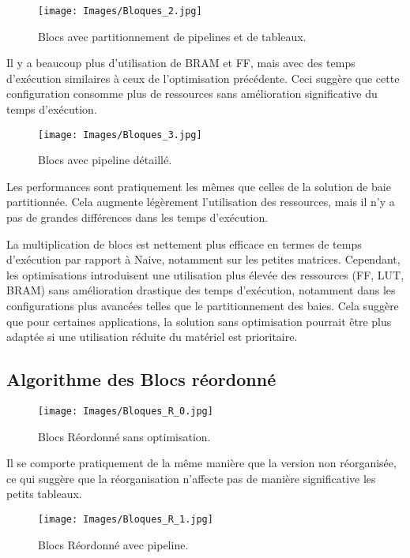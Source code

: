 \documentclass[../CSC_5RO06_TA.tex]{subfiles}
\begin{document}
\begin{figure}[H]
    \centering
    \texttt{[image: Images/Bloques\_2.jpg]}
    \caption{Blocs avec partitionnement de pipelines et de tableaux.}
    \label{fig:11}
\end{figure}

Il y a beaucoup plus d'utilisation de BRAM et FF, mais avec des temps d'exécution similaires à ceux de l'optimisation précédente. Ceci suggère que cette configuration consomme plus de ressources sans amélioration significative du temps d'exécution.

\begin{figure}[H]
    \centering
    \texttt{[image: Images/Bloques\_3.jpg]}
    \caption{Blocs avec pipeline détaillé.}
    \label{fig:12}
\end{figure}


Les performances sont pratiquement les mêmes que celles de la solution de baie partitionnée. Cela augmente légèrement l'utilisation des ressources, mais il n'y a pas de grandes différences dans les temps d'exécution.

La multiplication de blocs est nettement plus efficace en termes de temps d'exécution par rapport à Naive, notamment sur les petites matrices. Cependant, les optimisations introduisent une utilisation plus élevée des ressources (FF, LUT, BRAM) sans amélioration drastique des temps d'exécution, notamment dans les configurations plus avancées telles que le partitionnement des baies. Cela suggère que pour certaines applications, la solution sans optimisation pourrait être plus adaptée si une utilisation réduite du matériel est prioritaire.


\subsection{Algorithme des Blocs réordonné}

\begin{figure}[H]
    \centering
    \texttt{[image: Images/Bloques\_R\_0.jpg]}
    \caption{Blocs Réordonné sans optimisation.}
    \label{fig:13}
\end{figure}

Il se comporte pratiquement de la même manière que la version non réorganisée, ce qui suggère que la réorganisation n'affecte pas de manière significative les petits tableaux.

\begin{figure}[H]
    \centering
    \texttt{[image: Images/Bloques\_R\_1.jpg]}
    \caption{Blocs Réordonné avec pipeline.}
    \label{fig:14}
\end{figure}
\end{document}
